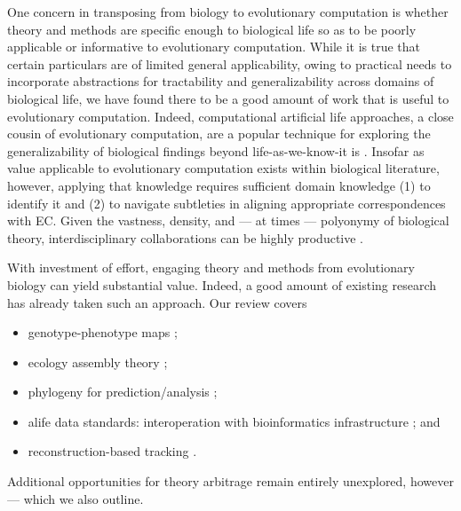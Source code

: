 One concern in transposing from biology to evolutionary computation is whether theory and methods are specific enough to biological life so as to be poorly applicable or informative to evolutionary computation.
While it is true that certain particulars are of limited general applicability, owing to practical needs to incorporate abstractions for tractability and generalizability across domains of biological life, we have found there to be a good amount of work that is useful to evolutionary computation.
Indeed, computational artificial life approaches, a close cousin of evolutionary computation, are a popular technique for exploring the generalizability of biological findings beyond life-as-we-know-it is \citep{cleland2013general}. %
Insofar as value applicable to evolutionary computation exists within biological literature, however, applying that knowledge requires sufficient domain knowledge (1) to identify it and (2) to navigate subtleties in aligning appropriate correspondences with EC.
Given the vastness, density, and --- at times --- polyonymy of biological theory, interdisciplinary collaborations can be highly productive \citep{goodman2020evolution}.

With investment of effort, engaging theory and methods from evolutionary biology can yield substantial value.
Indeed, a good amount of existing research has already taken such an approach.
Our review covers
\begin{itemize}
  \item genotype-phenotype maps \citep{TODO};
  \item ecology assembly theory \citep{dolson2024reachability}; %
  \item phylogeny for prediction/analysis \citep{hernandez2022can,shahbandegan2022untangling,moreno2024ecology};
  \item alife data standards: interoperation with bioinformatics infrastructure \citep{lalejini2019data,moreno2024apc}; and
  \item reconstruction-based tracking \citep{moreno2022hstrat,moreno2024guide}.
\end{itemize}
Additional opportunities for theory arbitrage remain entirely unexplored, however --- which we also outline.


